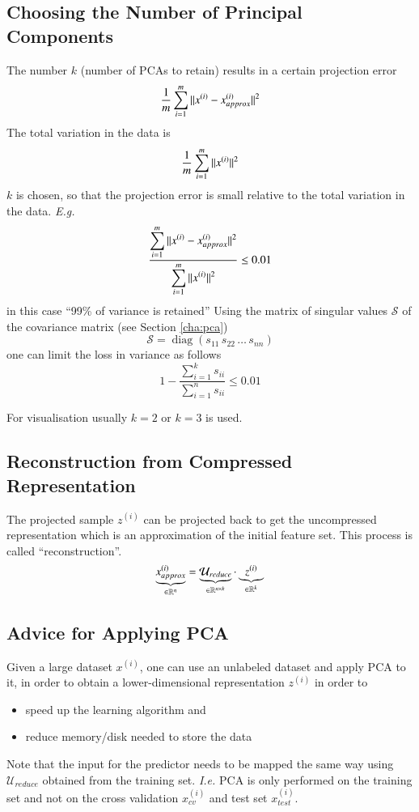 \documentclass[a4paper,twoside,10pt]{article}
\begin{document}
\subsection{Choosing the Number of Principal Components}
The number $k$ (number of \acp{PCA} to retain) results in a certain projection error
\begin{equation*}
  \frac{1}{m}\displaystyle\sum_{i=1}^m||x^{(i)}-x^{(i)}_{approx}||^2
\end{equation*}
The total variation in the data is
\begin{equation*}
  \frac{1}{m}\displaystyle\sum_{i=1}^m||x^{(i)}||^2
\end{equation*}
$k$ is chosen, so that the projection error is small relative to the total variation in the data. \emph{E.g.}
\begin{equation*}
  \frac{\displaystyle\sum_{i=1}^m||x^{(i)}-x^{(i)}_{approx}||^2}{\displaystyle\sum_{i=1}^m||x^{(i)}||^2}\le 0.01
\end{equation*}
in this case ``99\% of variance is retained''
Using the matrix of singular values $\mathcal{S}$ of the covariance matrix (see Section \ref{cha:pca})
\begin{equation*}
  \mathcal{S}=\operatorname{diag}(s_{11}\,s_{22}\,\ldots\,s_{nn})
\end{equation*}
one can limit the loss in variance as follows
\begin{equation*}
  1-\frac{\sum_{i=1}^k s_{ii}}{\sum_{i=1}^n s_{ii}}\le 0.01
\end{equation*}

For visualisation usually $k=2$ or $k=3$ is used.

\subsection{Reconstruction from Compressed Representation}
The projected sample $z^{(i)}$ can be projected back to get the uncompressed representation which is an approximation of the initial feature set. This process is called ``reconstruction''.
\begin{equation*}
  \underbrace{x^{(i)}_{approx}}_{\in\mathbb{R}^n}=\underbrace{\mathcal{U}_{reduce}}_{\in\mathbb{R}^{n\times k}}\cdot\underbrace{z^{(i)}}_{\in\mathbb{R}^k}
\end{equation*}

\subsection{Advice for Applying PCA}
Given a large dataset $x^{(i)}$, one can use an unlabeled dataset and apply \ac{PCA} to it, in order to obtain a lower-dimensional representation $z^{(i)}$ in order to
\begin{itemize}
  \item speed up the learning algorithm and
  \item reduce memory/disk needed to store the data
\end{itemize}
Note that the input for the predictor needs to be mapped the same way using $\mathcal{U}_{reduce}$ obtained from the training set. \emph{I.e.} \ac{PCA} is only performed on the training set and not on the cross validation $x^{(i)}_{cv}$ and test set $x^{(i)}_{test}$.
\end{document}
